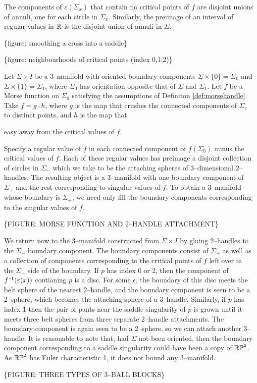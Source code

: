 The components of $\varepsilon(\Sigma_x)$ that contain no critical points of $f$ are disjoint unions of annuli, one for each circle in $\Sigma_x$.
Similarly, the preimage of an interval of regular values in $\mathbb{R}$ is the disjoint union of annuli in $\Sigma$.

\{figure: smoothing a cross into a saddle\}

\{figure: neighbourhoods of critical points (index 0,1,2)\}

Let $\Sigma\times I$ be a 3--manifold with oriented boundary components $\Sigma\times\{0\}=\Sigma_0$ and $\Sigma\times\{1\}=\Sigma_1$, where $\Sigma_0$ has orientation opposite that of $\Sigma$ and $\Sigma_1$.
Let $f$ be a Morse function on $\Sigma_0$ satisfying the assumptions of Definiton \ref{def:morsehandle}.
Take $f=g\comp h$, where $g$ is the map that crushes the connected components of $\Sigma_x$ to distinct points, and $h$ is the map that 


easy away from the critical values of $f$.

 Specify a regular value of $f$ in each connected component of $f(\Sigma_0)$ minus the critical values of $f$.
Each of these regular values has preimage a disjoint collection of circles in $\Sigma_-$ which we take to be the attaching spheres of 3--dimensional 2--handles. 
The resulting object is a 3--manifold with one boundary component of $\Sigma_+$ and the rest corresponding to singular values of $f$.
To obtain a 3--manifold whose boundary is $\Sigma_+$, we need only fill the boundary components corresponding to the singular values of $f$.

\{FIGURE: MORSE FUNCTION AND 2--HANDLE ATTACHMENT\}



We return now to the 3--manifold constructed from $\Sigma\times I$ by gluing 2--handles to the $\Sigma_-$ boundary component.
The boundary components consist of $\Sigma_+$ as well as a collection of components corresponding to the critical points of $f$ left over in the $\Sigma_-$ side of the boundary.
If $p$ has index 0 or 2, then the component of $f^{\,\text{-}1}(\varepsilon(x))$ contianing $p$ is a disc.
For some $\epsilon$, the boundary of this disc meets the belt sphere of the nearest 2--handle, and the boundary component is seen to be a 2--sphere, which becomes the attaching sphere of a 3--handle.
Similarly, if $p$ has index 1 then the pair of pants near the saddle singularity of $p$ is grown until it meets three belt spheres from three separate 2--handle attachments.
The boundary component is again seen to be a 2--sphere, so we can attach another 3--handle.
It is reasonable to note that, had $\Sigma$ not been oriented, then the boundary component corresponding to a saddle singularity could have been a copy of $\mathbb{RP}^2$.
As $\mathbb{RP}^2$ has Euler characteristic 1, it does not bound any 3--manifold.

\{FIGURE: THREE TYPES OF 3--BALL BLOCKS\}
